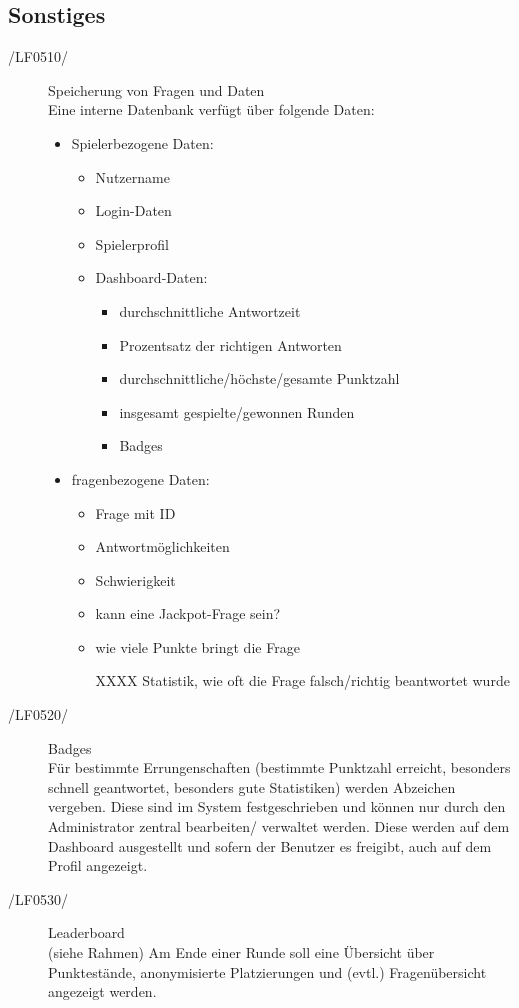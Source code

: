 \documentclass[11pt,a4paper]{scrreprt}
\begin{document}
\subsection{Sonstiges}
\begin{description}
\item[/LF0510/] Speicherung von Fragen und Daten \\
Eine interne Datenbank verfügt über folgende Daten:
	\begin{itemize}
	\item Spielerbezogene Daten:
		\begin{itemize}
		\item Nutzername
		\item Login-Daten
		\item Spielerprofil
		\item Dashboard-Daten:
			\begin{itemize}
			\item durchschnittliche Antwortzeit
			\item Prozentsatz der richtigen Antworten
			\item durchschnittliche/höchste/gesamte Punktzahl
			\item insgesamt gespielte/gewonnen Runden
			\item Badges
			\end{itemize}
		\end{itemize}
	\item fragenbezogene Daten:
		\begin{itemize}
		\item Frage mit ID
		\item Antwortmöglichkeiten
		\item Schwierigkeit
		\item kann eine Jackpot-Frage sein?
		\item wie viele Punkte bringt die Frage
		\item[XXXX] Statistik, wie oft die Frage falsch/richtig beantwortet wurde
		\end{itemize}
	\end{itemize}
\end{description}

\begin{description}
\item[/LF0520/] Badges \\
Für bestimmte Errungenschaften (bestimmte Punktzahl erreicht, besonders schnell geantwortet, besonders gute Statistiken) werden Abzeichen vergeben. Diese sind im System festgeschrieben und können nur durch den Administrator zentral bearbeiten/ verwaltet werden. Diese werden auf dem Dashboard ausgestellt und sofern der Benutzer es freigibt, auch auf dem Profil angezeigt.

\item[/LF0530/] Leaderboard \\
(siehe Rahmen) Am Ende einer Runde soll eine Übersicht über Punktestände, anonymisierte Platzierungen und (evtl.) Fragenübersicht angezeigt werden.
\end{description}
\end{document}
